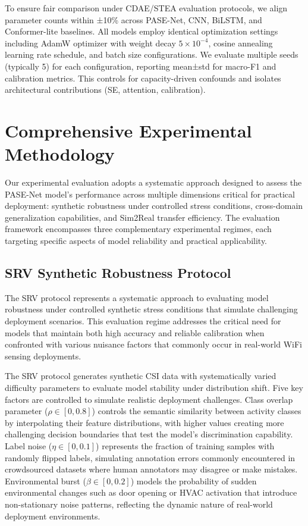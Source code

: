 \documentclass[journal]{IEEEtran}
\begin{document}
To ensure fair comparison under CDAE/STEA evaluation protocols, we align parameter counts within ±10\% across PASE-Net, CNN, BiLSTM, and Conformer-lite baselines. All models employ identical optimization settings including AdamW optimizer with weight decay $5 \times 10^{-4}$, cosine annealing learning rate schedule, and batch size configurations. We evaluate multiple seeds (typically 5) for each configuration, reporting mean±std for macro-F1 and calibration metrics. This controls for capacity-driven confounds and isolates architectural contributions (SE, attention, calibration).

\section{Comprehensive Experimental Methodology}

Our experimental evaluation adopts a systematic approach designed to assess the PASE-Net model's performance across multiple dimensions critical for practical deployment: synthetic robustness under controlled stress conditions, cross-domain generalization capabilities, and Sim2Real transfer efficiency. The evaluation framework encompasses three complementary experimental regimes, each targeting specific aspects of model reliability and practical applicability.

\subsection{SRV Synthetic Robustness Protocol}

The SRV protocol represents a systematic approach to evaluating model robustness under controlled synthetic stress conditions that simulate challenging deployment scenarios. This evaluation regime addresses the critical need for models that maintain both high accuracy and reliable calibration when confronted with various nuisance factors that commonly occur in real-world WiFi sensing deployments.

The SRV protocol generates synthetic CSI data with systematically varied difficulty parameters to evaluate model stability under distribution shift. Five key factors are controlled to simulate realistic deployment challenges. Class overlap parameter ($\rho \in [0, 0.8]$) controls the semantic similarity between activity classes by interpolating their feature distributions, with higher values creating more challenging decision boundaries that test the model's discrimination capability. Label noise ($\eta \in [0, 0.1]$) represents the fraction of training samples with randomly flipped labels, simulating annotation errors commonly encountered in crowdsourced datasets where human annotators may disagree or make mistakes. Environmental burst ($\beta \in [0, 0.2]$) models the probability of sudden environmental changes such as door opening or HVAC activation that introduce non-stationary noise patterns, reflecting the dynamic nature of real-world deployment environments.
\end{document}
